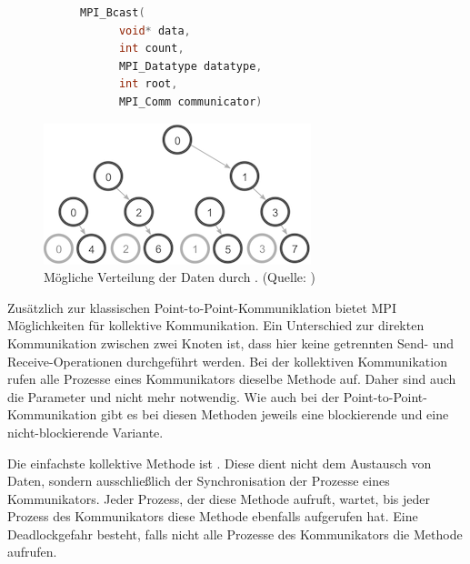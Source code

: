     \begin{center}
      \begin{figure}[b]
      \centering
      \begin{subfigure}{0.9\textwidth}
      \begin{lstlisting}[language=C, label=lst:bcast, caption={Die Syntax von \code{MPI\_Bcast}}, numbers=none]
	MPI_Bcast(
	  void* data,
	  int count,
	  MPI_Datatype datatype,
	  int root,
	  MPI_Comm communicator)
      \end{lstlisting}
      \end{subfigure}
      \end{figure}
      
      \begin{figure}[b]
	\includegraphics{img/bcast_tree_gray.png}
	\caption{Mögliche Verteilung der Daten durch . (Quelle: \citet{mpitut})}
	\label{fig:bcast_tree}
      \end{figure}
      \end{center}
      
      Zusätzlich zur klassischen Point-to-Point-Kommuniklation bietet MPI Möglichkeiten für kollektive Kommunikation. Ein Unterschied zur direkten Kommunikation zwischen zwei Knoten ist, dass hier
      keine getrennten Send- und Receive-Operationen durchgeführt werden. Bei der kollektiven Kommunikation rufen alle Prozesse eines Kommunikators dieselbe Methode auf. Daher sind auch die Parameter
       und  nicht mehr notwendig. Wie auch bei der Point-to-Point-Kommunikation gibt es bei diesen Methoden jeweils eine blockierende und eine nicht-blockierende Variante.
      
      Die einfachste kollektive Methode ist . Diese dient nicht dem Austausch von Daten, sondern ausschließlich der  Synchronisation der Prozesse eines Kommunikators.
      Jeder Prozess, der diese Methode aufruft, wartet, bis jeder Prozess des Kommunikators diese Methode ebenfalls aufgerufen hat. Eine Deadlockgefahr besteht, falls nicht alle Prozesse
      des Kommunikators die Methode aufrufen. \citep{mpiv31}
      
